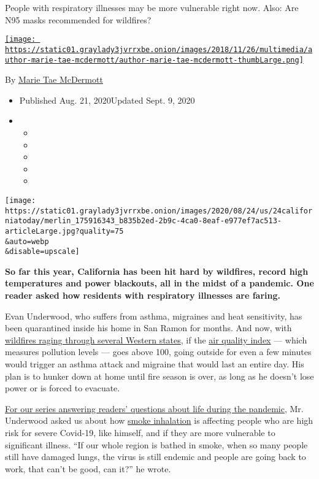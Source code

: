 People with respiratory illnesses may be more vulnerable right now.
Also: Are N95 masks recommended for wildfires?

\href{https://www.nytimes3xbfgragh.onion/by/marie-tae-mcdermott}{\texttt{[image: https://static01.graylady3jvrrxbe.onion/images/2018/11/26/multimedia/author-marie-tae-mcdermott/author-marie-tae-mcdermott-thumbLarge.png]}}

By
\href{https://www.nytimes3xbfgragh.onion/by/marie-tae-mcdermott}{Marie
Tae McDermott}

\begin{itemize}
\item
  Published Aug. 21, 2020Updated Sept. 9, 2020
\item
  \begin{itemize}
  \item
  \item
  \item
  \item
  \item
  \end{itemize}
\end{itemize}

\texttt{[image: https://static01.graylady3jvrrxbe.onion/images/2020/08/24/us/24californiatoday/merlin\_175916343\_b835b2ed-2b9c-4ca0-8eaf-e977ef7ac513-articleLarge.jpg?quality=75\\\&auto=webp\\\&disable=upscale]}

\textbf{So far this year, California has been hit hard by wildfires,
record high temperatures and power blackouts, all in the midst of a
pandemic. One reader asked how residents with respiratory illnesses are
faring.}

Evan Underwood, who suffers from asthma, migraines and heat sensitivity,
has been quarantined inside his home in San Ramon for months. And now,
with
\href{https://www.nytimes3xbfgragh.onion/2020/09/09/us/wildfires-live-updates.html}{wildfires
raging through several Western states}, if the
\href{https://gispub.epa.gov/airnow/}{air quality index} --- which
measures pollution levels --- goes above 100, going outside for even a
few minutes would trigger an asthma attack and migraine that would last
an entire day. His plan is to hunker down at home until fire season is
over, as long as he doesn't lose power or is forced to evacuate.

\href{https://www.nytimes3xbfgragh.onion/2020/06/17/us/coronavirus-california-life.html}{For
our series answering readers' questions about life during the pandemic},
Mr. Underwood asked us about how
\href{https://www.nytimes3xbfgragh.onion/2020/09/11/climate/california-smoke-wildfires.html}{smoke
inhalation} is affecting people who are high risk for severe Covid-19,
like himself, and if they are more vulnerable to significant illness.
``If our whole region is bathed in smoke, when so many people still have
damaged lungs, the virus is still endemic and people are going back to
work, that can't be good, can it?'' he wrote.

